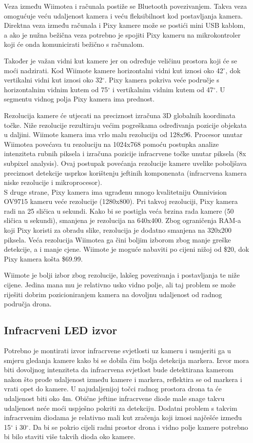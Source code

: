 \documentclass[times, utf8, diplomski]{fer}
\begin{document}
Veza između Wiimotea i računala postiže se Bluetooth povezivanjem. Takva veza omogućuje veću udaljenost kamera i veću fleksibilnost kod postavljanja kamera. Direktna veza između računala i Pixy kamere može se postići mini USB kablom, a ako je nužna bežična veza potrebno je spojiti Pixy kameru na mikrokontroler koji će onda komunicirati bežično s računalom.

Također je važan vidni kut kamere jer on određuje veličinu prostora koji će se moći nadzirati. Kod Wiimote kamere horizontalni vidni kut iznosi oko 42$^{\circ}$, dok vertikalni vidni kut iznosi oko 32$^{\circ}$. Pixy kamera pokriva veće područje s horizontalnim vidnim kutem od 75$^{\circ}$ i vertikalnim vidnim kutem od 47$^{\circ}$. U segmentu vidnog polja Pixy kamera ima prednost.

Rezolucija kamere će utjecati na preciznost izračuna 3D globalnih koordinata točke. Niže rezolucije rezultiraju većim pogreškama određivanja pozicije objekata u daljini. Wiimote kamera ima vrlo malu rezoluciju od 128x96. Procesor unutar Wiimotea povećava tu rezoluciju na 1024x768 pomoću postupka analize intenziteta rubnih piksela i izračuna pozicije infracrvene točke unutar piksela (8x subpixel analysis). Ovaj postupak povećanja rezolucije kamere uvelike poboljšava preciznost detekcije usprkos korištenju jeftinih komponenata (infracrvena kamera niske rezolucije i mikroprocesor).\\
S druge strane, Pixy kamera ima ugrađenu mnogo kvalitetniju Omnivision OV9715 kameru veće rezolucije (1280x800). Pri takvoj rezoluciji, Pixy kamera radi na 25 sličica u sekundi. Kako bi se postigla veća brzina rada kamere (50 sličica u sekundi), smanjena je rezolucija na 640x400. Zbog ograničenja RAM-a koji Pixy koristi za obradu slike, rezolucija je dodatno smanjena na 320x200 piksela. Veća rezolucija Wiimotea ga čini boljim izborom zbog manje greške detekcije, a i manje cjene. Wiimote je moguće nabaviti po cijeni nižoj od \$20, dok Pixy kamera košta \$69.99.

Wiimote je bolji izbor zbog rezolucije, lakšeg povezivanja i postavljanja te niže cijene. Jedina mana mu je relativno usko vidno polje, ali taj problem se može riješiti dobrim pozicioniranjem kamera na dovoljnu udaljenost od radnog područja drona.

\subsection{Infracrveni LED izvor}
Potrebno je montirati izvor infracrvene svjetlosti uz kameru i usmjeriti ga u smjeru gledanja kamere kako bi se dobila čim bolja detekcija markera. Izvor mora biti dovoljnog intenziteta da infracrvena svjetlost bude detektirana kamerom nakon što prođe udaljenost između kamere i markera, reflektira se od markera i vrati opet do kamere. U najudaljenijoj točci radnog prostora drona ta će udaljenost biti oko 4m. Obične jeftine infracrvene diode male snage takvu udaljenost neće moći uspješno pokriti za detekciju. Dodatni problem s takvim infracrvenim diodama je relativno mali kut zračenja koji iznosi najčešće između 15$^{\circ}$ i 30$^{\circ}$. Da bi se pokrio cijeli radni prostor drona i vidno polje kamere potrebno bi bilo staviti više takvih dioda oko kamere.
\end{document}
